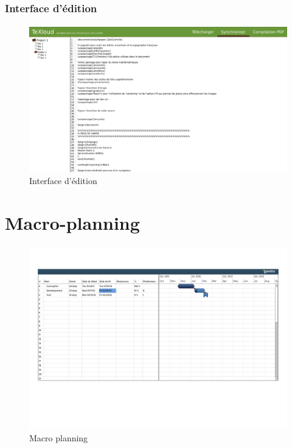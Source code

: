 \documentclass[a4paper,12pt]{article}
\begin{document}
\newpage
\subsubsection{Interface d'édition}
\paragraph{}
\begin{figure}[!ht]
\begin{center}
  \includegraphics[width=1\textwidth, angle=90]{../layout/layout_texloud_std.png}
\end{center}
  \caption{Interface d'édition}
  \label{uiEdit}
\end{figure}

\newpage
\section{Macro-planning}
\paragraph{}
\begin{figure}[!ht]
\begin{center}
  \includegraphics[width=1.1\textwidth,
angle=90]{./Ressources/macroPlanning.pdf}
\end{center}
  \caption{Macro planning}
  \label{uiProject}
\end{figure}
\end{document}
